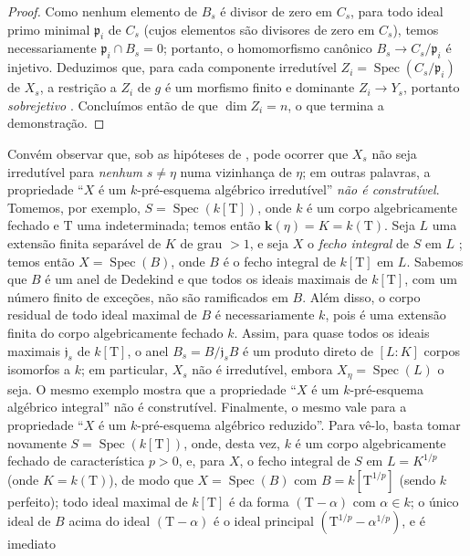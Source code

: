\begin{proof}
Como nenhum elemento de $B_s$ é divisor de zero em $C_s$, para todo ideal primo minimal $\mathfrak{p}_i$ de $C_s$ \textnormal{(}cujos elementos são divisores de zero em $C_s$\textnormal{)}, temos necessariamente $\mathfrak{p}_i\cap B_s=0$; portanto, o homomorfismo canônico $B_s\to C_s/\mathfrak{p}_i$ é injetivo.
Deduzimos que, para cada componente irredutível $Z_i=\operatorname{Spec}(C_s/\mathfrak{p}_i)$ de $X_s$, a restrição a $Z_i$ de $g$ é um morfismo finito e dominante $Z_i\to Y_s$, portanto \emph{sobrejetivo} .
Concluímos então de  que $\dim Z_i=n$, o que termina a demonstração.
\end{proof}

\begin{remark}[9.5.7]
\label{IV.9.5.7}
Convém observar que, sob as hipóteses de , pode ocorrer que $X_s$ não seja irredutível para \emph{nenhum} $s\neq\eta$ numa vizinhança de $\eta$; em outras palavras, a propriedade ``$X$ é um $k$-pré-esquema algébrico irredutível'' \emph{não é construtível}.
Tomemos, por exemplo, $S=\operatorname{Spec}(k[\mathrm{T}])$, onde $k$ é um corpo algebricamente fechado e $\mathrm{T}$ uma indeterminada; temos então $\boldsymbol{k}(\eta)=K=k(\mathrm{T})$.
Seja $L$ uma extensão finita separável de $K$ de grau $>1$, e seja $X$ o \emph{fecho integral} de $S$ em $L$ ; temos então $X=\operatorname{Spec}(B)$, onde $B$ é o fecho integral de $k[\mathrm{T}]$ em $L$.
Sabemos que $B$ é um anel de Dedekind e que todos os ideais maximais de $k[\mathrm{T}]$, com um número finito de exceções, não são ramificados em $B$.
Além disso, o corpo residual de todo ideal maximal de $B$ é necessariamente $k$, pois é uma extensão finita do corpo algebricamente fechado $k$.
Assim, para quase todos os ideais maximais $\mathfrak{j}_s$ de $k[\mathrm{T}]$, o anel $B_s=B/\mathfrak{j}_s B$ é um produto direto de $[L:K]$ corpos isomorfos a $k$; em particular, $X_s$ não é irredutível, embora $X_\eta=\operatorname{Spec}(L)$ o seja.
O mesmo exemplo mostra que a propriedade ``$X$ é um $k$-pré-esquema algébrico integral'' não é construtível.
Finalmente, o mesmo vale para a propriedade ``$X$ é um $k$-pré-esquema algébrico reduzido''.
Para vê-lo, basta tomar novamente $S=\operatorname{Spec}(k[\mathrm{T}])$, onde, desta vez, $k$ é um corpo algebricamente fechado de característica $p>0$, e, para $X$, o fecho integral de $S$ em $L=K^{1/p}$ \textnormal{(}onde $K=k(\mathrm{T})$\textnormal{)}, de modo que $X=\operatorname{Spec}(B)$ com $B=k[\mathrm{T}^{1/p}]$ \textnormal{(}sendo $k$ perfeito\textnormal{)}; todo ideal maximal de $k[\mathrm{T}]$ é da forma $(\mathrm{T}-\alpha)$ com $\alpha\in k$; o único ideal de $B$ acima do ideal $(\mathrm{T}-\alpha)$ é o ideal principal $(\mathrm{T}^{1/p}-\alpha^{1/p})$, e é imediato


\end{remark}
